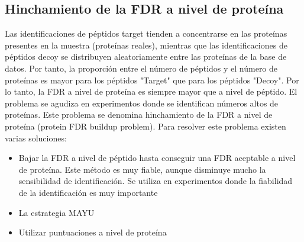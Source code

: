 \subsection{Hinchamiento de la FDR a nivel de proteína}
Las identificaciones de péptidos target tienden a concentrarse en las proteínas presentes en la muestra (proteínas reales), mientras que las identificaciones de péptidos decoy se distribuyen aleatoriamente entre las proteínas de la base de datos. Por tanto, la proporción entre el número de péptidos y el número de proteínas es mayor para los péptidos "Target" que para los péptidos "Decoy". Por lo tanto, la FDR a nivel de proteína es siempre mayor que a nivel de péptido. El problema se agudiza en experimentos donde se identifican números altos de proteínas. Este problema se denomina hinchamiento de la FDR a nivel de proteína (protein FDR buildup problem). Para resolver este problema existen varias soluciones:
\begin{itemize}
\item Bajar la FDR a nivel de péptido hasta conseguir una FDR aceptable a nivel de proteína. Este método es muy fiable, aunque disminuye mucho la sensibilidad de identificación. Se utiliza en experimentos donde la fiabilidad de la identificación es muy importante
\item La estrategia MAYU
\item Utilizar puntuaciones a nivel de proteína
\end{itemize}

